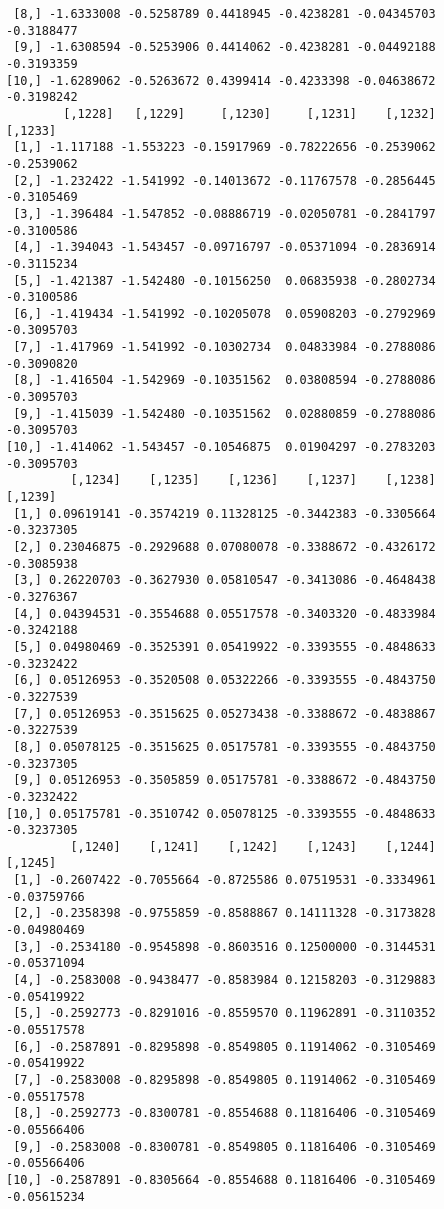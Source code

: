 \documentclass[
  letterpaper,
  DIV=11,
  numbers=noendperiod]{scrreprt}
\begin{document}
\begin{verbatim}
 [8,] -1.6333008 -0.5258789 0.4418945 -0.4238281 -0.04345703 -0.3188477
 [9,] -1.6308594 -0.5253906 0.4414062 -0.4238281 -0.04492188 -0.3193359
[10,] -1.6289062 -0.5263672 0.4399414 -0.4233398 -0.04638672 -0.3198242
        [,1228]   [,1229]     [,1230]     [,1231]    [,1232]    [,1233]
 [1,] -1.117188 -1.553223 -0.15917969 -0.78222656 -0.2539062 -0.2539062
 [2,] -1.232422 -1.541992 -0.14013672 -0.11767578 -0.2856445 -0.3105469
 [3,] -1.396484 -1.547852 -0.08886719 -0.02050781 -0.2841797 -0.3100586
 [4,] -1.394043 -1.543457 -0.09716797 -0.05371094 -0.2836914 -0.3115234
 [5,] -1.421387 -1.542480 -0.10156250  0.06835938 -0.2802734 -0.3100586
 [6,] -1.419434 -1.541992 -0.10205078  0.05908203 -0.2792969 -0.3095703
 [7,] -1.417969 -1.541992 -0.10302734  0.04833984 -0.2788086 -0.3090820
 [8,] -1.416504 -1.542969 -0.10351562  0.03808594 -0.2788086 -0.3095703
 [9,] -1.415039 -1.542480 -0.10351562  0.02880859 -0.2788086 -0.3095703
[10,] -1.414062 -1.543457 -0.10546875  0.01904297 -0.2783203 -0.3095703
         [,1234]    [,1235]    [,1236]    [,1237]    [,1238]    [,1239]
 [1,] 0.09619141 -0.3574219 0.11328125 -0.3442383 -0.3305664 -0.3237305
 [2,] 0.23046875 -0.2929688 0.07080078 -0.3388672 -0.4326172 -0.3085938
 [3,] 0.26220703 -0.3627930 0.05810547 -0.3413086 -0.4648438 -0.3276367
 [4,] 0.04394531 -0.3554688 0.05517578 -0.3403320 -0.4833984 -0.3242188
 [5,] 0.04980469 -0.3525391 0.05419922 -0.3393555 -0.4848633 -0.3232422
 [6,] 0.05126953 -0.3520508 0.05322266 -0.3393555 -0.4843750 -0.3227539
 [7,] 0.05126953 -0.3515625 0.05273438 -0.3388672 -0.4838867 -0.3227539
 [8,] 0.05078125 -0.3515625 0.05175781 -0.3393555 -0.4843750 -0.3237305
 [9,] 0.05126953 -0.3505859 0.05175781 -0.3388672 -0.4843750 -0.3232422
[10,] 0.05175781 -0.3510742 0.05078125 -0.3393555 -0.4848633 -0.3237305
         [,1240]    [,1241]    [,1242]    [,1243]    [,1244]     [,1245]
 [1,] -0.2607422 -0.7055664 -0.8725586 0.07519531 -0.3334961 -0.03759766
 [2,] -0.2358398 -0.9755859 -0.8588867 0.14111328 -0.3173828 -0.04980469
 [3,] -0.2534180 -0.9545898 -0.8603516 0.12500000 -0.3144531 -0.05371094
 [4,] -0.2583008 -0.9438477 -0.8583984 0.12158203 -0.3129883 -0.05419922
 [5,] -0.2592773 -0.8291016 -0.8559570 0.11962891 -0.3110352 -0.05517578
 [6,] -0.2587891 -0.8295898 -0.8549805 0.11914062 -0.3105469 -0.05419922
 [7,] -0.2583008 -0.8295898 -0.8549805 0.11914062 -0.3105469 -0.05517578
 [8,] -0.2592773 -0.8300781 -0.8554688 0.11816406 -0.3105469 -0.05566406
 [9,] -0.2583008 -0.8300781 -0.8549805 0.11816406 -0.3105469 -0.05566406
[10,] -0.2587891 -0.8305664 -0.8554688 0.11816406 -0.3105469 -0.05615234

\end{verbatim}
\end{document}
